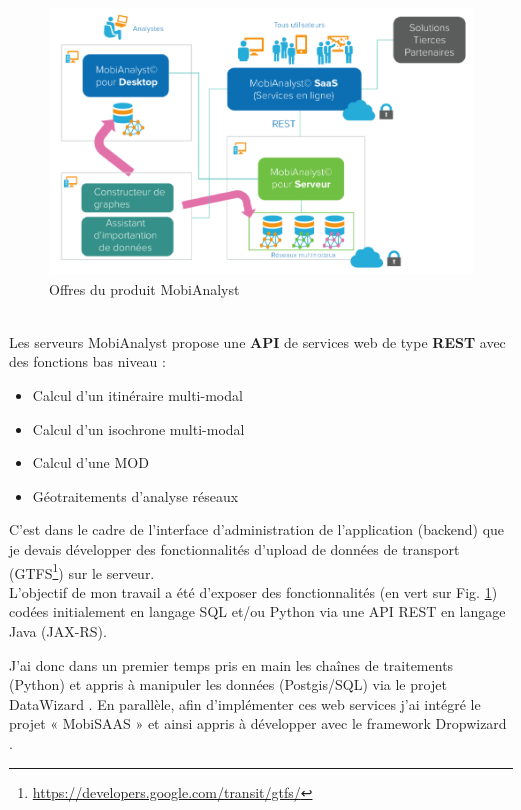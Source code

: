 \begin{figure}[h]
\centering
\includegraphics[width=16cm]{images/offre_MobiAnalyst.png}
\caption{\label{OffreMobiAnalyst}Offres du produit MobiAnalyst}
\end{figure} 
\\

Les serveurs MobiAnalyst propose une \textbf{API} de services web de type \textbf{REST} avec des fonctions bas niveau :
\begin{itemize}
\item Calcul d'un itinéraire multi-modal 
\item Calcul d'un isochrone multi-modal
\item Calcul d'une MOD
\item Géotraitements d'analyse réseaux 
\end{itemize}

C'est dans le cadre de l'interface d'administration de l'application (backend) que je devais développer des fonctionnalités d'upload de données de transport (GTFS\footnote{\url{https://developers.google.com/transit/gtfs/}}) sur le serveur.\\

L'objectif de mon travail a été d'exposer des fonctionnalités (en vert sur Fig. \ref{OffreMobiAnalyst}) codées initialement en langage SQL et/ou Python via une API REST en langage Java (JAX-RS). 

J'ai donc dans un premier temps pris en main les chaînes de traitements (Python) et appris à manipuler les données (Postgis/SQL) via le projet \og DataWizard \fg. En parallèle, afin d'implémenter ces web services j'ai intégré le projet « MobiSAAS » et ainsi appris à développer avec le framework \og Dropwizard \fg. \\

